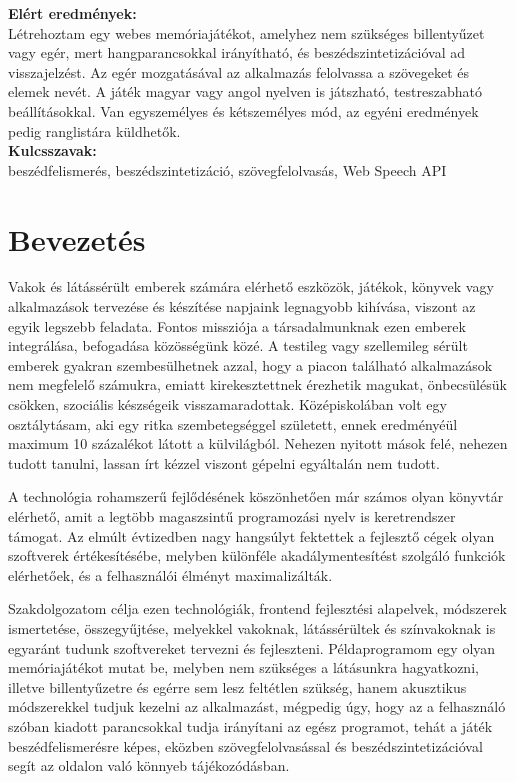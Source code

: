 \documentclass[12pt]{report}
\begin{document}
\noindent\textbf{Elért eredmények:} \\
\noindent Létrehoztam egy webes memóriajátékot, amelyhez nem szükséges billentyűzet vagy egér, mert hangparancsokkal irányítható, és beszédszintetizációval ad visszajelzést. Az egér mozgatásával az alkalmazás felolvassa a szövegeket és elemek nevét. A játék magyar vagy angol nyelven is játszható, testreszabható beállításokkal. Van egyszemélyes és kétszemélyes mód, az egyéni eredmények pedig ranglistára küldhetők. \\

\noindent \textbf{Kulcsszavak:} \\
\noindent beszédfelismerés, beszédszintetizáció, szövegfelolvasás, Web Speech API

\tableofcontents

\chapter*{Bevezetés}

Vakok és látássérült emberek számára elérhető eszközök, játékok, könyvek vagy alkalmazások tervezése és készítése napjaink legnagyobb kihívása, viszont az egyik legszebb feladata. Fontos missziója a társadalmunknak ezen emberek integrálása, befogadása közösségünk közé. A testileg vagy szellemileg sérült emberek gyakran szembesülhetnek azzal, hogy a piacon található alkalmazások nem megfelelő számukra, emiatt kirekesztettnek érezhetik magukat, önbecsülésük csökken, szociális készségeik visszamaradottak. Középiskolában volt egy osztálytásam, aki egy ritka szembetegséggel született, ennek eredményéül maximum 10 százalékot látott a külvilágból. Nehezen nyitott mások felé, nehezen tudott tanulni, lassan írt kézzel viszont gépelni egyáltalán nem tudott.

\noindent
A technológia rohamszerű fejlődésének köszönhetően már számos olyan könyvtár elérhető, amit a legtöbb magaszsintű programozási nyelv is keretrendszer támogat. Az elmúlt évtizedben nagy hangsúlyt fektettek a fejlesztő cégek olyan szoftverek értékesítésébe, melyben különféle akadálymentesítést szolgáló funkciók elérhetőek, és a felhasználói élményt maximalizálták.

\noindent
Szakdolgozatom célja ezen technológiák, frontend fejlesztési alapelvek, módszerek ismertetése, összegyűjtése, melyekkel vakoknak, látássérültek és színvakoknak is egyaránt tudunk szoftvereket tervezni és fejleszteni. Példaprogramom egy olyan memóriajátékot mutat be, melyben nem szükséges a látásunkra hagyatkozni, illetve billentyűzetre és egérre sem lesz feltétlen szükség, hanem akusztikus módszerekkel tudjuk kezelni az alkalmazást, mégpedig úgy, hogy az a felhasználó szóban kiadott parancsokkal tudja irányítani az egész programot, tehát a játék beszédfelismerésre képes, eközben szövegfelolvasással és beszédszintetizációval segít az oldalon való könnyeb tájékozódásban.
\end{document}
